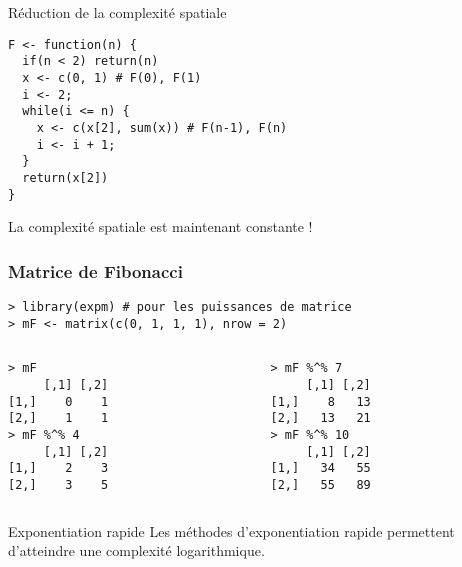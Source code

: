 \documentclass[10pt]{beamer}
\newcommand{\F}[1]{\ensuremath{{\cal F}_{#1}}\xspace}
\begin{document}
\begin{frame}[fragile]{Réduction de la complexité spatiale}
  
    \begin{lstlisting}[style=edblock]
F <- function(n) {
  if(n < 2) return(n)
  x <- c(0, 1) # F(0), F(1)
  i <- 2;
  while(i <= n) {
    x <- c(x[2], sum(x)) # F(n-1), F(n)
    i <- i + 1;
  }
  return(x[2]) 
}
\end{lstlisting}
%
\begin{alertblock}{La complexité spatiale est maintenant constante !}
 

\end{alertblock}
\end{frame}

\begin{frame}[fragile]
  \frametitle{Matrice de Fibonacci }
  \begin{lstlisting}
> library(expm) # pour les puissances de matrice   
> mF <- matrix(c(0, 1, 1, 1), nrow = 2)
\end{lstlisting}
  
\begin{columns}[t]
\begin{column}{0.48\textwidth}
  \begin{lstlisting}
> mF
     [,1] [,2]
[1,]    0    1
[2,]    1    1
> mF %^% 4
     [,1] [,2]
[1,]    2    3
[2,]    3    5
\end{lstlisting}

\end{column}
\begin{column}{0.48\textwidth}
  \begin{lstlisting}
> mF %^% 7
     [,1] [,2]
[1,]    8   13
[2,]   13   21
> mF %^% 10
     [,1] [,2]
[1,]   34   55
[2,]   55   89
\end{lstlisting}

\end{column}
\end{columns}


\begin{block}{Exponentiation rapide}
  Les méthodes d'exponentiation rapide permettent d'atteindre une \alert{complexité logarithmique}.
\end{block}
\end{frame}
\end{document}
